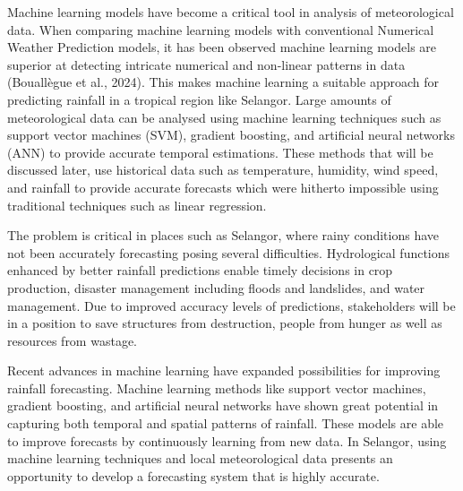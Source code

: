 \documentclass[12pt]{article}
\begin{document}
Machine learning models have become a critical tool in analysis of meteorological data. When comparing machine learning models with conventional Numerical Weather Prediction models, it has been observed machine learning models are superior at detecting intricate numerical and non-linear patterns in data (Bouallègue et al., 2024). This makes machine learning a suitable approach for predicting rainfall in a tropical region like Selangor. Large amounts of meteorological data can be analysed using machine learning techniques such as support vector machines (SVM), gradient boosting, and artificial neural networks (ANN) to provide accurate temporal estimations. These methods that will be discussed later, use historical data such as temperature, humidity, wind speed, and rainfall to provide accurate forecasts which were hitherto impossible using traditional techniques such as linear regression.

The problem is critical in places such as Selangor, where rainy conditions have not been accurately forecasting posing several difficulties. Hydrological functions enhanced by better rainfall predictions enable timely decisions in crop production, disaster management including floods and landslides, and water management. Due to improved accuracy levels of predictions, stakeholders will be in a position to save structures from destruction, people from hunger as well as resources from wastage.

Recent advances in machine learning have expanded possibilities for improving rainfall forecasting. Machine learning methods like support vector machines, gradient boosting, and artificial neural networks have shown great potential in capturing both temporal and spatial patterns of rainfall. These models are able to improve forecasts by continuously learning from new data. In Selangor, using machine learning techniques and local meteorological data presents an opportunity to develop a forecasting system that is highly accurate.
\end{document}
